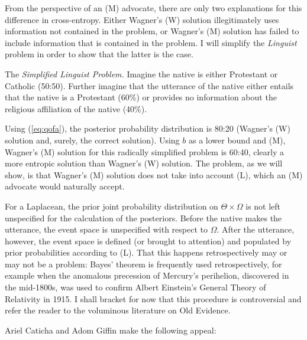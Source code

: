 \documentclass[11pt]{article}
\begin{document}
From the perspective of an (M) advocate, there are only two
explanations for this difference in cross-entropy. Either Wagner's (W)
solution illegitimately uses information not contained in the problem,
or Wagner's (M) solution has failed to include information that is
contained in the problem. I will simplify the \emph{Linguist} problem
in order to show that the latter is the case.

\begin{quotex}
  The \emph{Simplified Linguist Problem.} Imagine the native is either
  Protestant or Catholic (50:50). Further imagine that the utterance
  of the native either entails that the native is a Protestant (60\%)
  or provides no information about the religious affiliation of the
  native (40\%).
\end{quotex}

Using (\ref{eq:qofa}), the posterior probability distribution is 80:20
(Wagner's (W) solution and, surely, the correct solution). Using $b$
as a lower bound and (M), Wagner's (M) solution for this radically
simplified problem is 60:40, clearly a more entropic solution than
Wagner's (W) solution. The problem, as we will show, is that Wagner's
(M) solution does not take into account (L), which an (M) advocate
would naturally accept.

For a Laplacean, the prior joint probability distribution on
$\Theta\times\Omega$ is not left unspecified for the calculation of
the posteriors. Before the native makes the utterance, the event space
is unspecified with respect to $\Omega$. After the utterance, however,
the event space is defined (or brought to attention) and populated by
prior probabilities according to (L). That this happens
retrospectively may or may not be a problem: Bayes' theorem is
frequently used retrospectively, for example when the anomalous
precession of Mercury's perihelion, discovered in the mid-1800s, was
used to confirm Albert Einstein's General Theory of Relativity in
1915. I shall bracket for now that this procedure is controversial and
refer the reader to the voluminous literature on Old Evidence.

Ariel Caticha and Adom Giffin make the following
appeal:

\end{document}
